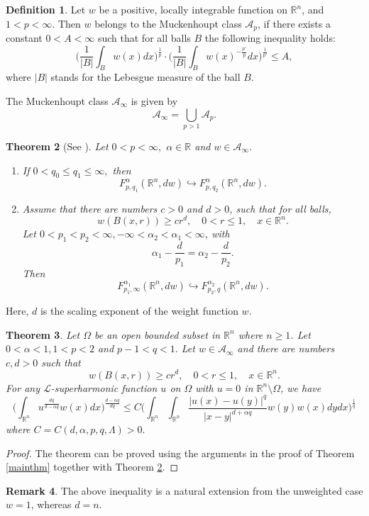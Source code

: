 \documentclass[12pt]{amsart}
\newcommand{\R}{\mathbb{R}}
\numberwithin{equation}{section}
\theoremstyle{plain}
\newtheorem{Thm}{Theorem}[section]
\theoremstyle{definition}
\newtheorem{Def}[Thm]{Definition}
\newtheorem{Rem}[Thm]{Remark}
\theoremstyle{remark}
\begin{document}
\begin{Def}
Let $w$ be a positive, locally integrable function on $\R^{n}$, and $1<p<\infty$. Then $w$ belongs to the Muckenhoupt class $\mathcal{A}_{p}$, if there exists a constant $0<A<\infty$ such that for all balls $B$ the following inequality holds:
\[
\Big( \frac{1}{|B|} \int_{B} w(x)dx\Big)^{\frac{1}{p}}\cdot \Big(\frac{1}{|B|}\int_{B}w(x)^{-\frac{p'}{p}}dx \Big)^{\frac{1}{p'}}\leq A,
\]
where $|B|$ stands for the Lebesgue measure of the ball $B$.
\end{Def}
The Muckenhoupt class $\mathcal{A}_{\infty}$ is given by
\[
\mathcal{A}_{\infty}=\bigcup_{p>1}\mathcal{A}_{p}.
\]
\begin{Thm} [{\text See \cite{Bui}}] \label{weightedTriebel}
Let $0<p<\infty,$ $\alpha\in\mathbb{R}$ and $w\in\mathcal{A}_{\infty}.$
\begin{enumerate}[label=(\arabic*)]
\item[(1)]If $0<q_{0}\leq q_{1}\leq \infty,$ then
\[
{F^{\alpha}_{p,q_{1}}(\R^{n},dw)}\hookrightarrow{F^{\alpha}_{p,q_{2}}(\R^{n},dw)}. 
\]
\item[(2)]  Assume that there are numbers $c>0$ and $d>0$, such that for all balls,
\[
w(B(x,r))\geq cr^{d},\quad 0<r\leq 1,\quad x\in\R^{n}.
\]
Let $0<p_{1}<p_{2}<\infty, -\infty<\alpha_{2}<\alpha_{1}<\infty$, with
\[
\alpha_{1}-\frac{d}{p_{1}}=\alpha_{2}-\frac{d}{p_{2}}.
\] Then
\[
{F^{\alpha_{1}}_{p_{1},\infty}(\R^{n},dw)}\hookrightarrow{F^{\alpha_{2}}_{p_{2},q}(\R^{n},dw)}. 
\]
\end{enumerate}
	\end{Thm}
	Here, $d$ is the scaling exponent of the weight function $w$. 
	\begin{Thm}\label{weighted}
Let $\Omega$ be an open bounded subset in $\R^{n}$ where $n\geq 1$. Let $0<\alpha<1, 1<p<2$ and $p-1<q<1.$ Let $w\in \mathcal{A}_{\infty}$ and there are numbers $c,d>0$ such that
\[
w(B(x,r))\geq cr^{d},\quad 0<r\leq 1,\quad x\in\R^{n}.
\]
For any $\mathcal{L}$-superharmonic function $u$ on $\Omega$ with $u=0$ in $\R^{n}\setminus\Omega$, we have
\[
\big( \int_{\R^{n}} u^{\frac{dq}{d-\alpha q}} w(x)dx\big)^{\frac{d-\alpha q}{dq}}\leq C \Big( \int_{\R^{n}}\int_{\R^{n}}\frac{|u(x)-u(y)|^{q}}{|x-y|^{d+\alpha q}}w(y)w(x) dydx\Big)^{\frac{1}{q}}
\]
where $C=C(d,\alpha,p,q,\Lambda)>0.$
\end{Thm}
\begin{proof}
The theorem can be proved using the arguments in the proof of Theorem \ref{mainthm} together with Theorem \ref{weightedTriebel}.
\end{proof}
\begin{Rem}
The above inequality is a natural extension from the unweighted case $w=1$, whereas $d=n$.
\end{Rem}
\end{document}
